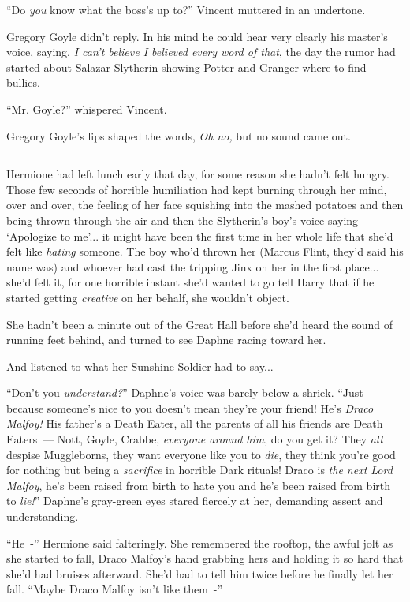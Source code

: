 ``Do \emph{you} know what the boss's up to?'' Vincent muttered in an undertone.

Gregory Goyle didn't reply. In his mind he could hear very clearly his master's voice, saying, \emph{I can't believe I believed every word of that}, the day the rumor had started about Salazar Slytherin showing Potter and Granger where to find bullies.

``Mr. Goyle?'' whispered Vincent.

Gregory Goyle's lips shaped the words, \emph{Oh no,} but no sound came out.

\begin{center}\rule{3in}{0.4pt}\end{center}

Hermione had left lunch early that day, for some reason she hadn't felt hungry. Those few seconds of horrible humiliation had kept burning through her mind, over and over, the feeling of her face squishing into the mashed potatoes and then being thrown through the air and then the Slytherin's boy's voice saying `Apologize to me'... it might have been the first time in her whole life that she'd felt like \emph{hating} someone. The boy who'd thrown her (Marcus Flint, they'd said his name was) and whoever had cast the tripping Jinx on her in the first place... she'd felt it, for one horrible instant she'd wanted to go tell Harry that if he started getting \emph{creative} on her behalf, she wouldn't object.

She hadn't been a minute out of the Great Hall before she'd heard the sound of running feet behind, and turned to see Daphne racing toward her.

And listened to what her Sunshine Soldier had to say...

``Don't you \emph{understand?}'' Daphne's voice was barely below a shriek. ``Just because someone's nice to you doesn't mean they're your friend! He's \emph{Draco Malfoy!} His father's a Death Eater, all the parents of all his friends are Death Eaters~--- Nott, Goyle, Crabbe, \emph{everyone around him}, do you get it? They \emph{all} despise Muggleborns, they want everyone like you to \emph{die}, they think you're good for nothing but being a \emph{sacrifice} in horrible Dark rituals! Draco is \emph{the next Lord Malfoy}, he's been raised from birth to hate you and he's been raised from birth to \emph{lie!}'' Daphne's gray-green eyes stared fiercely at her, demanding assent and understanding.

``He~-'' Hermione said falteringly. She remembered the rooftop, the awful jolt as she started to fall, Draco Malfoy's hand grabbing hers and holding it so hard that she'd had bruises afterward. She'd had to tell him twice before he finally let her fall. ``Maybe Draco Malfoy isn't like them~-''

